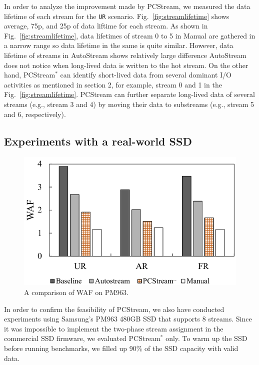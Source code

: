 In order to analyze the improvement made by {\sf PCStream}, 
we measured the data lifetime of each stream for the {\tt UR} scenario.
Fig.~\ref{fig:streamlifetime} shows average, 75p, and 25p of data liftime 
for each stream.
As shown in Fig.~\ref{fig:streamlifetime}, data lifetimes of stream 0 to 5
in \textsf{Manual} are gathered in a narrow range so data lifetime in
the same is quite similar.
However, data lifetime of streams in \textsf{AutoStream} shows relatively large difference
\textsf{AutoStream} does not notice when long-lived data is written to
the hot stream.
On the other hand, {\sf PCStream$^*$} can identify short-lived data from 
several dominant I/O activities as mentioned 
in section 2, for example, stream 0 and 1 in the Fig.~\ref{fig:streamlifetime}.
\textsf{PCStream} can further separate long-lived data of several streams 
(e.g., stream 3 and 4)
by moving their data to substreams (e.g., stream 5 and 6, respectively). 

\vspace{-5pt}
\subsection{Experiments with a real-world SSD}
\vspace{-5pt}

\begin{figure}[t]
	\centering
	\includegraphics[width=0.8\linewidth]{figure/result_ssd}
	\vspace{-10pt}
	\caption{A comparison of WAF on PM963.}
	\label{fig:result_SSD}
	\vspace{-15pt}
\end{figure}

In order to confirm the feasibility of \textsf{PCStream}, we also have
conducted experiments using Samsung's PM963 480GB SSD that supports 8 streams.
Since it was impossible to implement the two-phase stream assignment in the
commercial SSD firmware, we evaluated {\sf PCStream$^*$} only.  To warm up the
SSD before running benchmarks, we filled up 90\% of the SSD capacity with valid
data.

